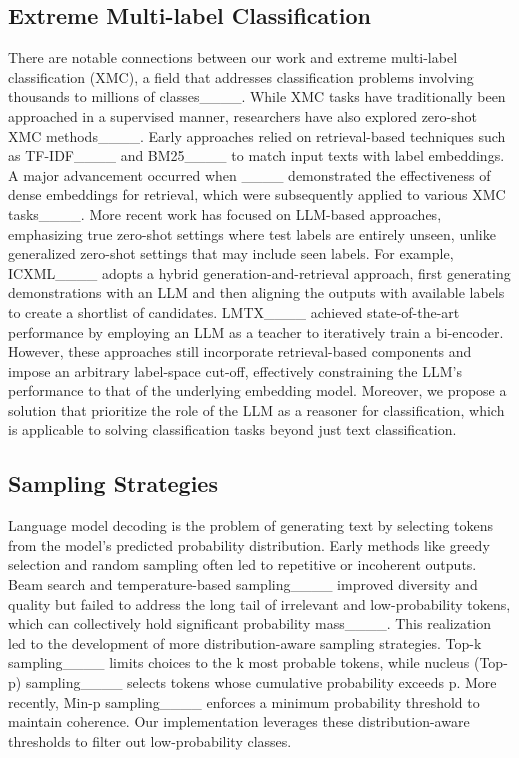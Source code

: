 \subsection{Extreme Multi-label Classification}
There are notable connections between our work and extreme multi-label classification (XMC), a field that addresses classification problems involving thousands to millions of classes____. While XMC tasks have traditionally been approached in a supervised manner, researchers have also explored zero-shot XMC methods____. Early approaches relied on retrieval-based techniques such as TF-IDF____ and BM25____ to match input texts with label embeddings. A major advancement occurred when ____ demonstrated the effectiveness of dense embeddings for retrieval, which were subsequently applied to various XMC tasks____. More recent work has focused on LLM-based approaches, emphasizing true zero-shot settings where test labels are entirely unseen, unlike generalized zero-shot settings that may include seen labels. For example, ICXML____ adopts a hybrid generation-and-retrieval approach, first generating demonstrations with an LLM and then aligning the outputs with available labels to create a shortlist of candidates. LMTX____ achieved state-of-the-art performance by employing an LLM as a teacher to iteratively train a bi-encoder. However, these approaches still incorporate retrieval-based components and impose an arbitrary label-space cut-off, effectively constraining the LLM’s performance to that of the underlying embedding model. Moreover, we propose a solution that prioritize the role of the LLM as a reasoner for classification, which is applicable to solving classification tasks beyond just text classification. 

\subsection{Sampling Strategies}
Language model decoding is the problem of generating text by selecting tokens from the model’s predicted probability distribution. Early methods like greedy selection and random sampling often led to repetitive or incoherent outputs. Beam search and temperature-based sampling____ improved diversity and quality but failed to address the long tail of irrelevant and low-probability tokens, which can collectively hold significant probability mass____.
This realization led to the development of more distribution-aware sampling strategies. Top-k sampling____ limits choices to the k most probable tokens, while nucleus (Top-p) sampling____ selects tokens whose cumulative probability exceeds p. More recently, Min-p sampling____ enforces a minimum probability threshold to maintain coherence. Our implementation leverages these distribution-aware thresholds to filter out low-probability classes.